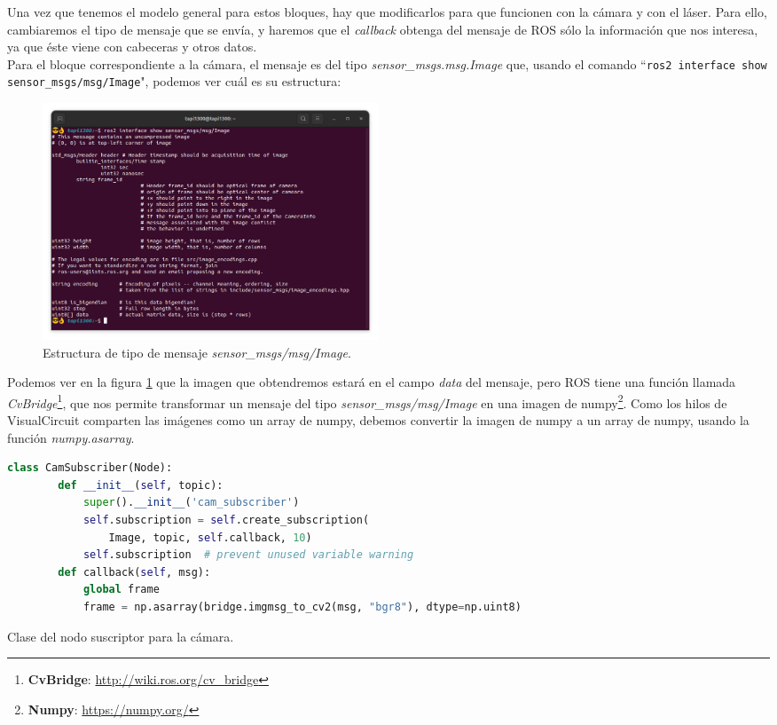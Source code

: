 Una vez que tenemos el modelo general para estos bloques, hay que modificarlos para que funcionen con la cámara y con el láser. Para ello, cambiaremos el tipo de mensaje que se envía, y haremos que el \textit{callback} obtenga del mensaje de ROS sólo la información que nos interesa, ya que éste viene con cabeceras y otros datos.\\

Para el bloque correspondiente a la cámara, el mensaje es del tipo \textit{sensor\_msgs.msg.Image} que, usando el comando ``\lstinline|ros2 interface show sensor_msgs/msg/Image|", podemos ver cuál es su estructura:
\begin{figure} [H]
  \begin{center}
      \includegraphics[width=10cm]{figs/c4/image_struct.png}
  \end{center}
  \caption[Estructura mensaje Image]{Estructura de tipo de mensaje \textit{sensor\_msgs/msg/Image}.}
  \label{fig:image_struct}
\end{figure}
Podemos ver en la figura \ref{fig:image_struct} que la imagen que obtendremos estará en el campo \textit{data} del mensaje, pero ROS tiene una función llamada \textit{CvBridge}\footnote{\textbf{CvBridge}: \url{http://wiki.ros.org/cv_bridge}}, que nos permite transformar un mensaje del tipo \textit{sensor\_msgs/msg/Image} en una imagen de numpy\footnote{\textbf{Numpy}: \url{https://numpy.org/}}. Como los hilos de VisualCircuit comparten las imágenes como un array de numpy, debemos convertir la imagen de numpy a un array de numpy, usando la función \textit{numpy.asarray}.
\begin{code}[H]
  \begin{lstlisting}[language=python]
    class CamSubscriber(Node):
        def __init__(self, topic):
            super().__init__('cam_subscriber')
            self.subscription = self.create_subscription(
                Image, topic, self.callback, 10)
            self.subscription  # prevent unused variable warning
        def callback(self, msg):
            global frame
            frame = np.asarray(bridge.imgmsg_to_cv2(msg, "bgr8"), dtype=np.uint8)
  \end{lstlisting}
  \caption[Clase del nodo suscriptor para cámara]{Clase del nodo suscriptor para la cámara.}
  \label{cod:cam_node_class}
\end{code}
